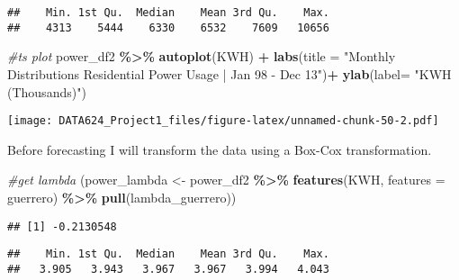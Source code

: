 \documentclass[
]{article}
\newenvironment{Shaded}{\begin{snugshade}}{\end{snugshade}}
\newcommand{\AttributeTok}[1]{\textcolor[rgb]{0.13,0.29,0.53}{#1}}
\newcommand{\CommentTok}[1]{\textcolor[rgb]{0.56,0.35,0.01}{\textit{#1}}}
\newcommand{\FunctionTok}[1]{\textcolor[rgb]{0.13,0.29,0.53}{\textbf{#1}}}
\newcommand{\NormalTok}[1]{#1}
\newcommand{\OtherTok}[1]{\textcolor[rgb]{0.56,0.35,0.01}{#1}}
\newcommand{\SpecialCharTok}[1]{\textcolor[rgb]{0.81,0.36,0.00}{\textbf{#1}}}
\newcommand{\StringTok}[1]{\textcolor[rgb]{0.31,0.60,0.02}{#1}}
\begin{document}
\begin{verbatim}
##    Min. 1st Qu.  Median    Mean 3rd Qu.    Max. 
##    4313    5444    6330    6532    7609   10656
\end{verbatim}

\begin{Shaded}
\begin{Highlighting}[]
\CommentTok{\#ts plot}
\NormalTok{power\_df2 }\SpecialCharTok{\%\textgreater{}\%}
  \FunctionTok{autoplot}\NormalTok{(KWH) }\SpecialCharTok{+}
  \FunctionTok{labs}\NormalTok{(}\AttributeTok{title =} \StringTok{"Monthly Distributions Residential Power Usage | Jan \textquotesingle{}98 {-} Dec \textquotesingle{}13"}\NormalTok{)}\SpecialCharTok{+}
  \FunctionTok{ylab}\NormalTok{(}\AttributeTok{label=} \StringTok{"KWH (Thousands)"}\NormalTok{)}
\end{Highlighting}
\end{Shaded}

\texttt{[image: DATA624\_Project1\_files/figure-latex/unnamed-chunk-50-2.pdf]}

Before forecasting I will transform the data using a Box-Cox
transformation.

\begin{Shaded}
\begin{Highlighting}[]
\CommentTok{\#get lambda}
\NormalTok{(power\_lambda }\OtherTok{\textless{}{-}}\NormalTok{ power\_df2 }\SpecialCharTok{\%\textgreater{}\%}
  \FunctionTok{features}\NormalTok{(KWH, }\AttributeTok{features =}\NormalTok{ guerrero) }\SpecialCharTok{\%\textgreater{}\%}
  \FunctionTok{pull}\NormalTok{(lambda\_guerrero))}
\end{Highlighting}
\end{Shaded}

\begin{verbatim}
## [1] -0.2130548
\end{verbatim}

\begin{Shaded}
\end{Shaded}

\begin{verbatim}
##    Min. 1st Qu.  Median    Mean 3rd Qu.    Max. 
##   3.905   3.943   3.967   3.967   3.994   4.043
\end{verbatim}
\end{document}
